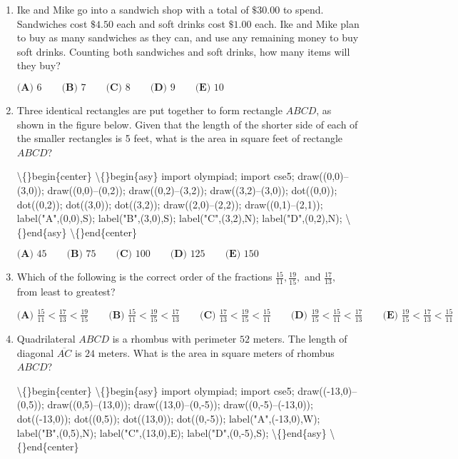 \documentclass{article}
\begin{document}
\begin{enumerate}[label=\arabic*., itemsep=0.5em]\item Ike and Mike go into a sandwich shop with a total of \(\$30.00\) to spend. Sandwiches cost \(\$4.50\) each and soft drinks cost \(\$1.00\) each. Ike and Mike plan to buy as many sandwiches as they can, and use any remaining money to buy soft drinks. Counting both sandwiches and soft drinks, how many items will they buy?

\(\textbf{(A) }6\qquad\textbf{(B) }7\qquad\textbf{(C) }8\qquad\textbf{(D) }9\qquad\textbf{(E) }10\)\par \vspace{0.5em}\item Three identical rectangles are put together to form rectangle \(ABCD\), as shown in the figure below. Given that the length of the shorter side of each of the smaller rectangles is  5 feet, what is the area in square feet of rectangle \(ABCD\)?


\textbackslash\{\}begin\{center\}
\textbackslash\{\}begin\{asy\}
import olympiad;
import cse5;
draw((0,0)--(3,0));
draw((0,0)--(0,2));
draw((0,2)--(3,2));
draw((3,2)--(3,0));
dot((0,0));
dot((0,2));
dot((3,0));
dot((3,2));
draw((2,0)--(2,2));
draw((0,1)--(2,1));
label("A",(0,0),S);
label("B",(3,0),S);
label("C",(3,2),N);
label("D",(0,2),N);
\textbackslash\{\}end\{asy\}
\textbackslash\{\}end\{center\}


\(\textbf{(A) }45\qquad\textbf{(B) }75\qquad\textbf{(C) }100\qquad\textbf{(D) }125\qquad\textbf{(E) }150\)\par \vspace{0.5em}\item Which of the following is the correct order of the fractions \(\frac{15}{11},\frac{19}{15},\) and \(\frac{17}{13},\) from least to greatest?

\(\textbf{(A) }\frac{15}{11}< \frac{17}{13}< \frac{19}{15}  \qquad\textbf{(B) }\frac{15}{11}< \frac{19}{15}<\frac{17}{13}    \qquad\textbf{(C) }\frac{17}{13}<\frac{19}{15}<\frac{15}{11}    \qquad\textbf{(D) } \frac{19}{15}<\frac{15}{11}<\frac{17}{13}   \qquad\textbf{(E) }   \frac{19}{15}<\frac{17}{13}<\frac{15}{11}\)\par \vspace{0.5em}\item Quadrilateral \(ABCD\) is a rhombus with perimeter \(52\) meters. The length of diagonal \(\overline{AC}\) is \(24\) meters. What is the area in square meters of rhombus \(ABCD\)?


\textbackslash\{\}begin\{center\}
\textbackslash\{\}begin\{asy\}
import olympiad;
import cse5;
draw((-13,0)--(0,5));
draw((0,5)--(13,0));
draw((13,0)--(0,-5));
draw((0,-5)--(-13,0));
dot((-13,0));
dot((0,5));
dot((13,0));
dot((0,-5));
label("A",(-13,0),W);
label("B",(0,5),N);
label("C",(13,0),E);
label("D",(0,-5),S);
\textbackslash\{\}end\{asy\}
\textbackslash\{\}end\{center\}



\end{enumerate}
\end{document}
